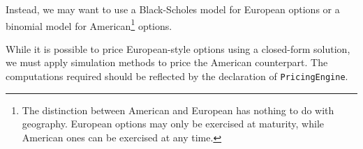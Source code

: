 Instead, we may want to use a Black-Scholes model for European
options or a binomial model for American\footnote{The distinction
between American and European has nothing to do with geography. European
options may only be exercised at maturity, while American ones can be
exercised at any time.} options\cite{HULL}.

While it is possible to price European-style options using a closed-form 
solution, we must apply simulation methods to price the American counterpart.
The computations required should be reflected by the declaration of
\texttt{PricingEngine}.
